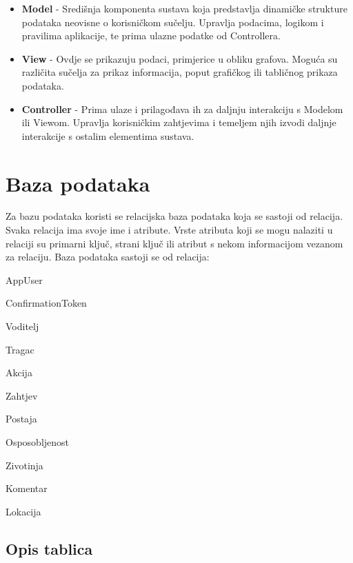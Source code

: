 	\begin{itemize}
		\item \textbf{Model} - Središnja komponenta sustava koja predstavlja dinamičke strukture podataka neovisne o korisničkom sučelju. Upravlja podacima, logikom i pravilima aplikacije, te prima ulazne podatke od Controllera.
		\item \textbf{View} - Ovdje se prikazuju podaci, primjerice u obliku grafova. Moguća su različita sučelja za prikaz informacija, poput grafičkog ili tabličnog prikaza podataka.
		\item \textbf{Controller} - Prima ulaze i prilagođava ih za daljnju interakciju s Modelom ili Viewom. Upravlja korisničkim zahtjevima i temeljem njih izvodi daljnje interakcije s ostalim elementima sustava.
	\end{itemize}
		

		

				
		\section{Baza podataka}
				
				Za bazu podataka koristi se relacijska baza podataka koja se sastoji od relacija. Svaka relacija ima svoje ime i atribute. Vrste atributa koji se mogu nalaziti u relaciji su primarni ključ, strani ključ ili atribut s nekom informacijom vezanom za relaciju. Baza podataka sastoji se od relacija:
		
				\begin{packed_item}
					\item AppUser
					\item ConfirmationToken
					\item Voditelj
					\item Tragac
					\item Akcija
					\item Zahtjev
					\item Postaja
					\item Osposobljenost
					\item Zivotinja
					\item Komentar
					\item Lokacija 
				\end{packed_item}
		
			\subsection{Opis tablica}
			


